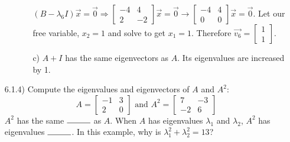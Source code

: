 \documentclass[12pt,pdftex]{article}
\begin{document}
\begin{itemize}
\begin{itemize}
\begin{itemize}
                        $(B-\lambda_6I)\vec{x}=\vec{0} \Rightarrow 
             			\begin{bmatrix}-4 & 4 \\ 2 & -2\end{bmatrix}\vec{x}=\vec{0} \longrightarrow \begin{bmatrix}
             			-4 & 4 \\ 0 & 0
             			\end{bmatrix}\vec{x}=\vec{0}$. Let our free variable, $x_2=1$ and solve to get $x_1=1$.
                        Therefore $\vec{v_6}=\begin{bmatrix}1 \\ 1\end{bmatrix}$.
                        
           \item[c)] $A+I$ has the same eigenvectors as $A$. Its eigenvalues are increased by 1.
	      \end{itemize}
\end{itemize}

\item[6.1.4)] Compute the eigenvalues and eigenvectors of $A$ and $A^2$:
\[A=\begin{bmatrix}-1 & 3 \\ 2 & 0\end{bmatrix} \text{ and } A^2=\begin{bmatrix}7 & -3 \\ -2 & 6\end{bmatrix}\]
$A^2$ has the same $\rule{1cm}{0.15mm}$ as $A$. When $A$ has eigenvalues $\lambda_1$ and $\lambda_2$, $A^2$ has eigenvalues $\rule{1cm}{0.15mm}$. In this example, why is $\lambda_1^2+\lambda_2^2=13$?


\end{itemize}
\end{document}
